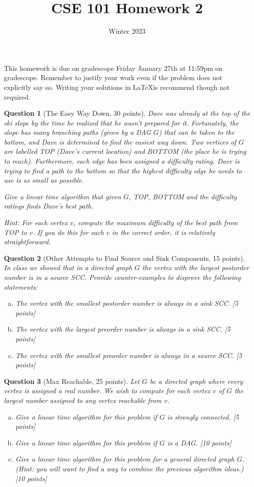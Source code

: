 \documentclass{article}
\title{CSE 101 Homework 2}
\date{Winter 2023}
\newtheorem{ques}{Question}
\begin{document}
\maketitle

This homework is due on gradescope Friday January 27th at 11:59pm on gradescope. Remember to justify your work even if the problem does not explicitly say so. Writing your solutions in \LaTeX is recommend though not required.

\begin{ques}[The Easy Way Down, 30 points]
Dave was already at the top of the ski slope by the time he realized that he wasn't prepared for it. Fortunately, the slope has many branching paths (given by a DAG $G$) that can be taken to the bottom, and Dave is determined to find the easiest way down. Two vertices of $G$ are labelled TOP (Dave's current location) and BOTTOM (the place he is trying to reach). Furthermore, each edge has been assigned a difficulty rating. Dave is trying to find a path to the bottom so that the highest difficulty edge he needs to use is as small as possible.

Give a linear time algorithm that given $G$, TOP, BOTTOM and the difficulty ratings finds Dave's best path.

Hint: For each vertex $v$, compute the maximum difficulty of the best path from TOP to $v$. If you do this for each $v$ in the correct order, it is relatively straightforward.
\end{ques}

\begin{ques}[Other Attempts to Find Source and Sink Components, 15 points]
In class we showed that in a directed graph $G$ the vertex with the largest postorder number is in a source SCC. Provide counter-examples to disprove the following statements:
\begin{enumerate}[(a)]
\item The vertex with the smallest postorder number is always in a sink SCC. [5 points]
\item The vertex with the largest preorder number is always in a sink SCC. [5 points]
\item The vertex with the smallest preorder number is always in a source SCC. [5 points]
\end{enumerate}
\end{ques}

\begin{ques}[Max Reachable, 25 points]
Let $G$ be a directed graph where every vertex is assigned a real number. We wish to compute for each vertex $v$ of $G$ the largest number assigned to any vertex reachable from $v$.
\begin{enumerate}[(a)]
\item Give a linear time algorithm for this problem if $G$ is strongly connected. [5 points]
\item Give a linear time algorithm for this problem if $G$ is a DAG. [10 points]
\item Give a linear time algorithm for this problem for a general directed graph $G$. (Hint: you will want to find a way to combine the previous algorithm ideas.) [10 points]
\end{enumerate}
\end{ques}
\end{document}
